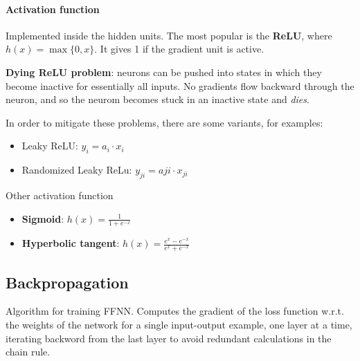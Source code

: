\documentclass[a4paper,6pt,twocolumn,fleqn]{article}
\begin{document}
\paragraph{Activation function} Implemented inside the hidden units. The most popular is the \textbf{ReLU}, where \(h(x) = \max\{0,x\}\). It gives 1 if the gradient unit is active.

\textbf{Dying ReLU problem}: neurons can be pushed into states in which they become inactive for essentially all inputs. No gradients flow backward through the neuron, and so the neurom becomes stuck in an inactive state and \emph{dies}.

In order to mitigate these problems, there are some variants, for examples:
\begin{itemize}
    \item Leaky ReLU: \(y_i = a_i \cdot x_i\)
    \item Randomized Leaky ReLu: \(y_{ji} = a{ji} \cdot x_{ji}\)
\end{itemize}
Other activation function
\begin{itemize}
    \item \textbf{Sigmoid}: \(h(x) = \frac 1 {1 + e^{-x}}\)
    \item \textbf{Hyperbolic tangent}: \(h(x) = \frac {e^x - e^{-x}} {e^x + e^{-x}}\)
\end{itemize}
\subsection{Backpropagation} %
Algorithm for training FFNN. Computes the gradient of the loss function w.r.t. the weights of the network for a single input-output example, one layer at a time, iterating backword from the last layer to avoid redundant calculations in the chain rule.
\end{document}
